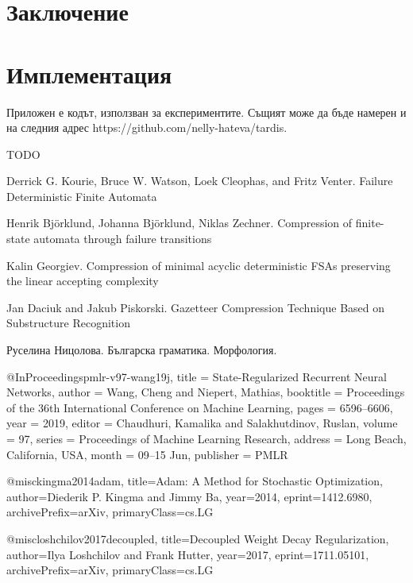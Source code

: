 \documentclass[a4paper,12pt]{article}
\begin{document}
\pagebreak

\section{Заключение}

\section{Имплементация}

Приложен е кодът, използван за експериментите. Същият може да бъде намерен и на следния адрес https://github.com/nelly-hateva/tardis.

TODO

\pagebreak

\begin{thebibliography}{}

\newblock Derrick G. Kourie, Bruce W. Watson, Loek Cleophas, and Fritz Venter.
\newblock Failure Deterministic Finite Automata

\newblock Henrik Björklund, Johanna Björklund, Niklas Zechner.
\newblock Compression of finite-state automata through failure transitions

\newblock Kalin Georgiev.
\newblock Compression of minimal acyclic deterministic FSAs preserving the linear accepting complexity

\newblock Jan Daciuk and Jakub Piskorski.
\newblock Gazetteer Compression Technique Based on Substructure Recognition

\newblock Руселина Ницолова.
\newblock Българска граматика. Морфология.

@InProceedings{pmlr-v97-wang19j,  
          title = 	 {State-Regularized Recurrent Neural Networks},  
          author = 	 {Wang, Cheng and Niepert, Mathias},  
          booktitle = 	 {Proceedings of the 36th International Conference on Machine Learning},  
          pages = 	 {6596--6606},  
          year = 	 {2019},  
          editor = 	 {Chaudhuri, Kamalika and Salakhutdinov, Ruslan},  
          volume = 	 {97},  
          series = 	 {Proceedings of Machine Learning Research},  
          address = 	 {Long Beach, California, USA},  
          month = 	 {09--15 Jun},  
          publisher = 	 {PMLR}  
        }

@misc{kingma2014adam,
    title={Adam: A Method for Stochastic Optimization},
    author={Diederik P. Kingma and Jimmy Ba},
    year={2014},
    eprint={1412.6980},
    archivePrefix={arXiv},
    primaryClass={cs.LG}
}

@misc{loshchilov2017decoupled,
    title={Decoupled Weight Decay Regularization},
    author={Ilya Loshchilov and Frank Hutter},
    year={2017},
    eprint={1711.05101},
    archivePrefix={arXiv},
    primaryClass={cs.LG}
}

\end{thebibliography}

\pagebreak
\end{document}
